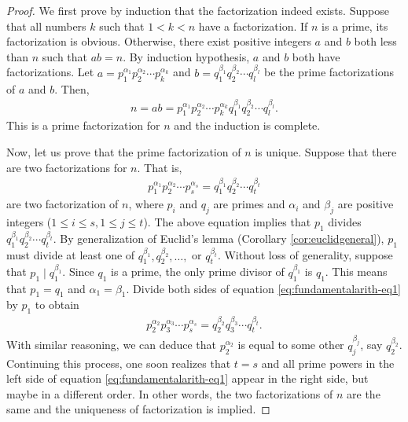 \documentclass{subfile}
\begin{document}
	\begin{proof}
		We first prove by induction that the factorization indeed exists. Suppose that all numbers $k$ such that $1<k<n$ have a factorization. If $n$ is a prime, its factorization is obvious. Otherwise, there exist positive integers $a$ and $b$ both less than $n$ such that $ab=n$. By induction hypothesis, $a$ and $b$ both have factorizations. Let $a=p_1^{\alpha_1}p_2^{\alpha_2}\cdots p_k^{\alpha_k}$ and $b=q_1^{\beta_1}q_2^{\beta_2}\cdots q_l^{\beta_l}$ be the prime factorizations of $a$ and $b$. Then,
		\begin{align*}
			n = ab = p_1^{\alpha_1}p_2^{\alpha_2}\cdots p_k^{\alpha_k}q_1^{\beta_1}q_2^{\beta_2}\cdots q_l^{\beta_l}.
		\end{align*}
		This is a prime factorization for $n$ and the induction is complete.

		Now, let us prove that the prime factorization of $n$ is unique. Suppose that there are two factorizations for $n$. That is,
		\begin{align}
			p_1^{\alpha_1}p_2^{\alpha_2}\cdots p_s^{\alpha_s}=q_1^{\beta_1}q_2^{\beta_2}\cdots q_t^{\beta_t} \label{eq:fundamentalarith-eq1}
		\end{align}
		are two factorization of $n$, where $p_i$ and $q_j$ are primes and $\alpha_i$ and $\beta_j$ are positive integers ($1 \leq i \leq s, 1 \leq j \leq t$). The above equation implies that $p_1$ divides $q_1^{\beta_1}q_2^{\beta_2}\cdots q_t^{\beta_t}$. By generalization of Euclid's lemma (Corollary \eqref{cor:euclidgeneral}), $p_1$ must divide at least one of $q_1^{\beta_1},q_2^{\beta_2},\dots,$ or $q_t^{\beta_t}$. Without loss of generality, suppose that $p_1\mid q_1^{\beta_1}$. Since $q_1$ is a prime, the only prime divisor of $q_1^{\beta_1}$ is $q_1$. This means that $p_1=q_1$ and $\alpha_1=\beta_1$. Divide both sides of equation \eqref{eq:fundamentalarith-eq1} by $p_1$ to obtain
		\begin{align*}
			p_2^{\alpha_2}p_3^{\alpha_3}\cdots p_s^{\alpha_s}=q_2^{\beta_2}q_3^{\beta_3}\cdots q_t^{\beta_t}.
		\end{align*}
		With similar reasoning, we can deduce that $p_2^{\alpha_2}$ is equal to some other $q_j^{\beta_j}$, say $q_{2}^{\beta_2}$. Continuing this process, one soon realizes that $t=s$ and all prime powers in the left side of equation \eqref{eq:fundamentalarith-eq1} appear in the right side, but maybe in a different order. In other words, the two factorizations of $n$ are the same and the uniqueness of factorization is implied.
	\end{proof}
\end{document}

